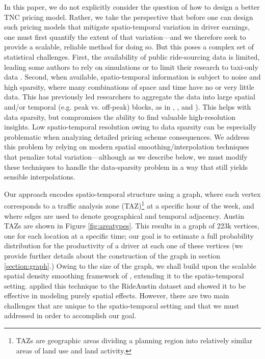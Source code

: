 \documentclass[a4paper, 11pt]{article}
\begin{document}
In this paper, we do not explicitly consider the question of how to design a better TNC pricing model.  Rather, we take the perspective that before one can design such pricing models that mitigate spatio-temporal variation in driver earnings, one must first quantify the extent of that variation---and we therefore seek to provide a scalable, reliable method for doing so.  But this poses a complex set of statistical challenges.  First, the availability of public ride-sourcing data is limited, leading some authors to rely on simulations \citep{ma-2018, spatial2} or to limit their research to taxi-only data \citep{spatial3, spatial4}.  Second, when available, spatio-temporal information is subject to noise and high sparsity, where many combinations of space and time have no or very little data.  This has previously led researchers to aggregate the data into large spatial and/or temporal (e.g. peak vs. off-peak) blocks, as in \citet{spatial3}, \citet{spatial4}, and \citet{friction8}).  This helps with data sparsity, but compromises the ability to find valuable high-resolution insights.  Low spatio-temporal resolution owing to data sparsity can be especially problematic when analyzing detailed pricing scheme consequences.  We address this problem by relying on modern spatial smoothing/interpolation techniques that penalize total variation---although as we describe below, we must modify these techniques to handle the data-sparsity problem in a way that still yields sensible interpolations.




Our approach encodes spatio-temporal structure using a graph, where each vertex corresponds to a traffic analysis zone (TAZ)\footnote{TAZs are geographic areas dividing a planning region into relatively similar areas of land use and land activity.} at a specific hour of the week, and where edges are used to denote geographical and temporal adjacency. Austin TAZs are shown in Figure \ref{fig:areatypes}. This results in a graph of 223k vertices, one for each location at a specific time; our goal is to estimate a full probability distribution for the productivity of a driver at each one of these vertices (we provide further details about the construction of the graph in section \ref{section:graph}.)  Owing to the size of the graph, we shall build upon the scalable spatial density smoothing framework of \citet{tansey-etal-2017}, extending it to the spatio-temporal setting. \citet{zuniga-etal-2019} applied this technique to the RideAustin dataset and showed it to be effective in modeling purely spatial effects. However, there are two main challenges that are unique to the spatio-temporal setting and that we must addressed in order to accomplish our goal.
\end{document}
